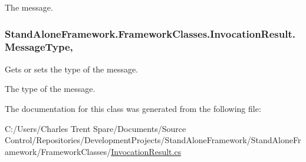 The message.\hypertarget{class_stand_alone_framework_1_1_framework_classes_1_1_invocation_result_a581f41c7d799d0ea4eb63660cc901b7c}{
\subsubsection[{Message\+Type}]{ Stand\+Alone\+Framework.\+Framework\+Classes.\+Invocation\+Result.\+Message\+Type\hspace{0.3cm}{\ttfamily [get]}, {\ttfamily [set]}}}\label{class_stand_alone_framework_1_1_framework_classes_1_1_invocation_result_a581f41c7d799d0ea4eb63660cc901b7c}


Gets or sets the type of the message. 

The type of the message.

The documentation for this class was generated from the following file\+:\begin{DoxyCompactItemize}
\item 
C\+:/\+Users/\+Charles Trent Spare/\+Documents/\+Source Control/\+Repositories/\+Development\+Projects/\+Stand\+Alone\+Framework/\+Stand\+Alone\+Framework/\+Framework\+Classes/\hyperlink{_invocation_result_8cs}{Invocation\+Result.\+cs}\end{DoxyCompactItemize}
